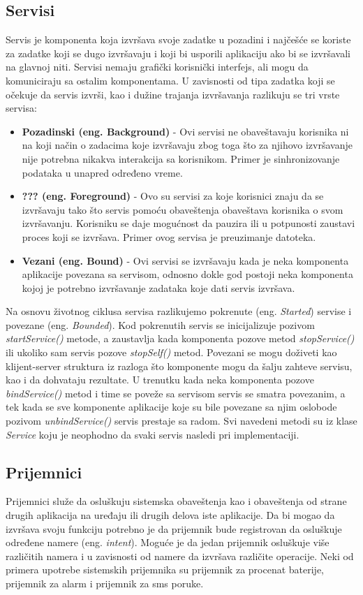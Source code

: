 \documentclass[android.tex]{subfiles}
\begin{document}
\subsection{Servisi}
Servis je komponenta koja izvršava svoje zadatke u pozadini i najčešće se koriste za zadatke koji se dugo izvršavaju i koji bi usporili aplikaciju ako bi se izvršavali na glavnoj niti. Servisi nemaju grafički korisnički interfejs, ali mogu da komuniciraju sa ostalim komponentama. \cite{book:hellman} U zavisnosti od tipa zadatka koji se očekuje da servis izvrši, kao i dužine trajanja izvršavanja razlikuju se tri vrste servisa:
\begin{itemize}
    \item \textbf{Pozadinski (eng. Background)} - Ovi servisi ne obaveštavaju korisnika ni na koji način o zadacima koje izvršavaju zbog toga što za njihovo izvršavanje nije potrebna nikakva interakcija sa korisnikom. Primer je sinhronizovanje podataka u unapred određeno vreme.  
    \item \textbf{??? (eng. Foreground)} - Ovo su servisi za koje korisnici znaju da se izvršavaju tako što servis pomoću obaveštenja obaveštava korisnika o svom izvršavanju. Korisniku se daje mogućnost da pauzira ili u potpunosti zaustavi proces koji se izvršava. Primer ovog servisa je preuzimanje datoteka.
    \item \textbf{Vezani (eng. Bound)} - Ovi servisi se izvršavaju kada je neka komponenta aplikacije povezana sa servisom, odnosno dokle god postoji neka komponenta kojoj je potrebno izvršavanje zadataka koje dati servis izvršava.
\end{itemize}

Na osnovu životnog ciklusa servisa razlikujemo pokrenute (eng. \textit{Started}) servise i povezane (eng. \textit{Bounded}). Kod pokrenutih servis se inicijalizuje pozivom \textit{startService() }metode, a zaustavlja kada komponenta pozove metod \textit{stopService() }ili ukoliko sam servis pozove\textit{ stopSelf() }metod. Povezani se mogu doživeti kao klijent-server struktura iz razloga što komponente mogu da šalju zahteve servisu, kao i da dohvataju rezultate. U trenutku kada neka komponenta pozove \textit{bindService()} metod i time se poveže sa servisom servis se smatra povezanim, a tek kada se sve komponente aplikacije koje su bile povezane sa njim oslobode pozivom \textit{unbindService() }servis prestaje sa radom. Svi navedeni metodi su iz klase \textit{Service} koju je neophodno da svaki servis nasledi pri implementaciji.


\subsection{Prijemnici}
Prijemnici služe da osluškuju sistemska obaveštenja kao i obaveštenja od strane drugih aplikacija na uređaju ili drugih delova iste aplikacije. Da bi mogao da izvršava svoju funkciju potrebno je da prijemnik bude registrovan da osluškuje određene namere (eng.\textit{ intent}). Moguće je da jedan prijemnik osluškuje više različitih namera i u zavisnosti od namere da izvršava različite operacije. Neki od primera upotrebe sistemskih prijemnika su prijemnik za procenat baterije, prijemnik za alarm i prijemnik za sms poruke. \cite{book:mzivkovic}
\end{document}
